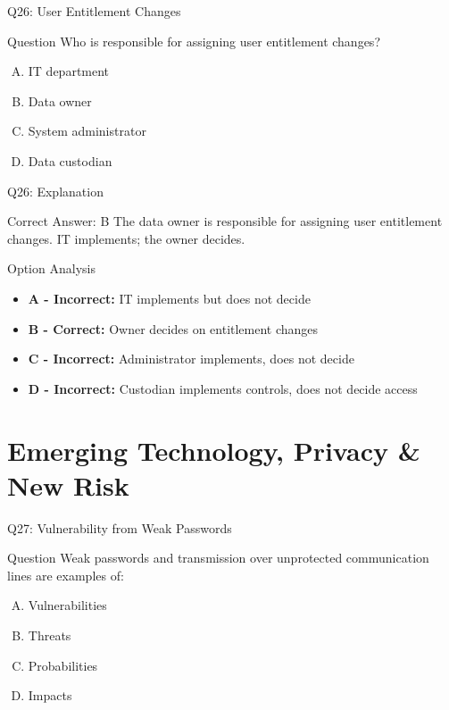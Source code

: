 \documentclass{beamer}
\begin{document}
	\begin{frame}{Q26: User Entitlement Changes}
		\begin{block}{Question}
			Who is responsible for assigning user entitlement changes?
		\end{block}
		\begin{enumerate}[(A)]
			\item IT department
			\item Data owner
			\item System administrator
			\item Data custodian
		\end{enumerate}
	\end{frame}
	
	\begin{frame}{Q26: Explanation}
		\begin{block}{Correct Answer: B}
			The data owner is responsible for assigning user entitlement changes. IT implements; the owner decides.
		\end{block}
		\begin{block}{Option Analysis}
			\begin{itemize}
				\item \textbf{A - Incorrect:} IT implements but does not decide
				\item \textbf{B - Correct:} Owner decides on entitlement changes
				\item \textbf{C - Incorrect:} Administrator implements, does not decide
				\item \textbf{D - Incorrect:} Custodian implements controls, does not decide access
			\end{itemize}
		\end{block}
	\end{frame}
	
	
	\section{Emerging Technology, Privacy \& New Risk}
	
	\begin{frame}{Q27: Vulnerability from Weak Passwords}
		\begin{block}{Question}
			Weak passwords and transmission over unprotected communication lines are examples of:
		\end{block}
		\begin{enumerate}[(A)]
			\item Vulnerabilities
			\item Threats
			\item Probabilities
			\item Impacts
		\end{enumerate}
	\end{frame}
	
\end{document}
